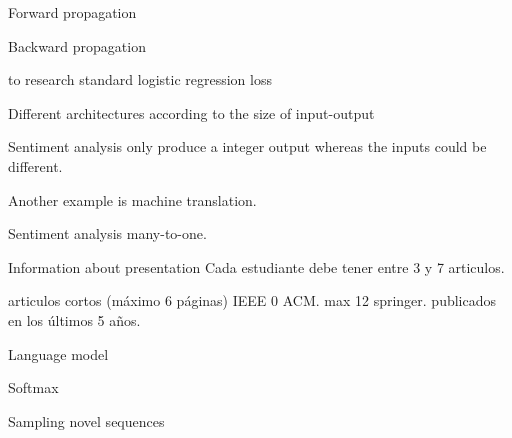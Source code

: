 \documentclass{beamer}
\begin{document}
\begin{frame}{Forward propagation}


\end{frame}



\begin{frame}{Backward propagation}


\end{frame}


\begin{frame}
to research standard logistic regression loss

\end{frame}







\begin{frame}{Different architectures according to the size of input-output}

Sentiment analysis only produce a integer output  whereas the inputs could be different.

Another example is machine translation.


\end{frame}



\begin{frame}{Sentiment analysis}
many-to-one.


\end{frame}



\begin{frame}{Information about presentation}
Cada estudiante debe tener entre 3 y 7 articulos.

articulos cortos (máximo 6 páginas) IEEE 0 ACM.
max 12 springer.
publicados en los últimos 5 años.


\end{frame}



\begin{frame}{Language model}


\end{frame}

\begin{frame}{Softmax}


\end{frame}


\begin{frame}{Sampling novel sequences}


\end{frame}
\end{document}
